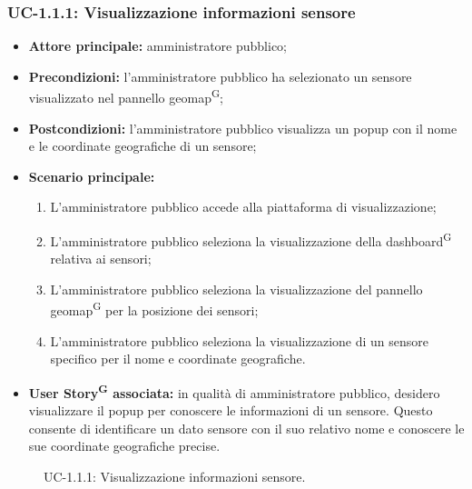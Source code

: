 \documentclass[8pt]{article}
\newcommand{\glossterm}[1]{#1\textsuperscript{G}} %
\begin{document}
\subsubsection*{UC-1.1.1: Visualizzazione informazioni sensore}
\begin{itemize}
    \item \textbf{Attore principale:} amministratore pubblico;
    \item \textbf{Precondizioni:} l'amministratore pubblico ha selezionato un sensore visualizzato nel pannello \glossterm{geomap};
    \item \textbf{Postcondizioni:} l'amministratore pubblico visualizza un popup con il nome e le coordinate geografiche di un sensore;
    \item \textbf{Scenario principale:}
    \begin{enumerate}
        \item L'amministratore pubblico accede alla piattaforma di visualizzazione;
        \item L'amministratore pubblico seleziona la visualizzazione della \glossterm{dashboard} relativa ai sensori;
        \item L'amministratore pubblico seleziona la visualizzazione del pannello \glossterm{geomap} per la posizione dei sensori;
        \item L'amministratore pubblico seleziona la visualizzazione di un sensore specifico per il nome e coordinate geografiche.
    \end{enumerate}
    \item \textbf{\glossterm{User Story} associata:} in qualità di amministratore pubblico, desidero visualizzare il popup per conoscere le informazioni di un sensore. Questo consente di identificare un dato sensore con il suo relativo nome e conoscere le sue coordinate geografiche precise.
\end{itemize}
\begin{figure}[ht!]
    \centering
    \caption{UC-1.1.1: Visualizzazione informazioni sensore.}
    \label{fig:UC-1.1.1: Visualizzazione informazioni sensore}
\end{figure}
\end{document}
